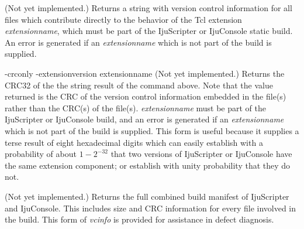 \begin{tclcommanddescription}
\begin{tclcommandinternaldescription}{}
(Not yet implemented.)  Returns a string with version control information for all
files which contribute directly to the behavior of the Tcl extension \emph{extensionname}, 
which must be part of the IjuScripter or IjuConsole static build.
An error is generated if an \emph{extensionname} which is not part of the build
is supplied.
\end{tclcommandinternaldescription}

\begin{tclcommandinternaldescription}{
      {-crconly -extensionversion extensionname}}
(Not yet implemented.)  Returns the CRC32 of the the string result of the command above.  
Note that the value returned is the CRC of the version control information embedded in the file(s)
rather than the CRC(s) of the file(s).
\emph{extensionname} must be part of the IjuScripter or IjuConsole build, and 
an error is generated if an \emph{extensionname} which is not part of the build is supplied.
This form is
useful because it supplies a terse result of eight hexadecimal digits which can easily
establish with a probability of about $1-2^{-32}$ that two versions of IjuScripter or IjuConsole
have the same extension component; or establish with unity probability that they do not.
\end{tclcommandinternaldescription}

\begin{tclcommandinternaldescription}{}
(Not yet implemented.)  Returns the full combined build manifest of IjuScripter and IjuConsole.
This includes size and CRC information for every file involved in the build.  This form
of \emph{vcinfo} is provided for assistance in defect diagnosis.
\end{tclcommandinternaldescription}

\end{tclcommanddescription}


